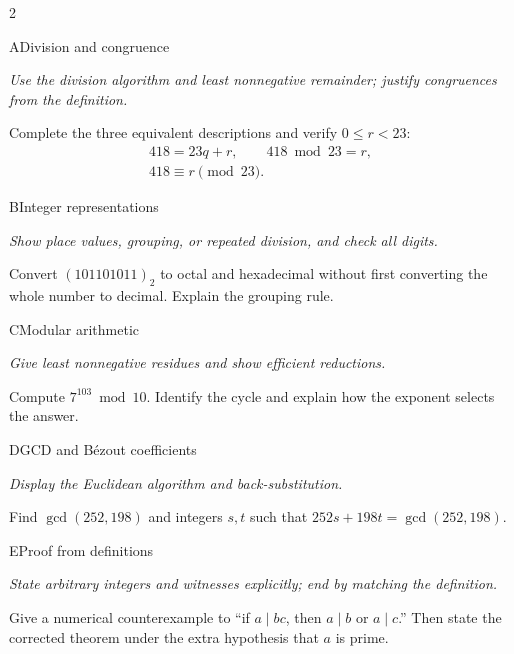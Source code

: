 \documentclass[9pt]{extarticle}
\begin{document}
\begin{multicols}{2}
\begin{CoreProblem}{A}{Division and congruence}
{\scriptsize\textit{Use the division algorithm and least nonnegative remainder; justify congruences from the definition.}\par}
Complete the three equivalent descriptions and verify $0\le r<23$:
\[
\begin{gathered}
418=23q+r,\qquad 418\bmod 23=r,\\
418\equiv r\pmod{23}.
\end{gathered}
\]
\end{CoreProblem}
\begin{CoreProblem}{B}{Integer representations}
{\scriptsize\textit{Show place values, grouping, or repeated division, and check all digits.}\par}
Convert $(101101011)_2$ to octal and hexadecimal without first converting the
whole number to decimal. Explain the grouping rule.
\end{CoreProblem}
\begin{CoreProblem}{C}{Modular arithmetic}
{\scriptsize\textit{Give least nonnegative residues and show efficient reductions.}\par}
Compute $7^{103}\bmod10$. Identify the cycle and explain how the exponent
selects the answer.
\end{CoreProblem}
\columnbreak
\begin{CoreProblem}{D}{GCD and B\'ezout coefficients}
{\scriptsize\textit{Display the Euclidean algorithm and back-substitution.}\par}
Find $\gcd(252,198)$ and integers $s,t$ such that
$252s+198t=\gcd(252,198)$.
\end{CoreProblem}
\begin{CoreProblem}{E}{Proof from definitions}
{\scriptsize\textit{State arbitrary integers and witnesses explicitly; end by matching the definition.}\par}
Give a numerical counterexample to ``if $a\mid bc$, then $a\mid b$ or
$a\mid c$.'' Then state the corrected theorem under the extra hypothesis that
$a$ is prime.
\end{CoreProblem}
\end{multicols}
\CoreWorkArea
\FormBreak
{}
\end{document}
